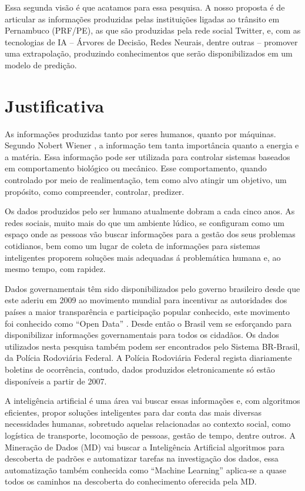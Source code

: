 Essa segunda visão é que acatamos para essa pesquisa. A nosso proposta é de articular as informações produzidas pelas instituições ligadas ao trânsito em Pernambuco (PRF/PE), as que são produzidas pela rede social Twitter, e, com as tecnologias de IA -- Árvores de Decisão, Redes Neurais, dentre outras -- promover uma extrapolação, produzindo conhecimentos que serão disponibilizados em um modelo de predição.

\section{Justificativa}

As informações produzidas tanto por seres humanos, quanto por máquinas. Segundo Nobert Wiener \cite{Salles2007}, a informação tem tanta importância quanto a energia e a matéria. Essa informação pode ser utilizada para controlar sistemas baseados em comportamento biológico ou mecânico. Esse comportamento, quando controlado por meio de realimentação, tem como alvo atingir um objetivo, um propósito, como compreender, controlar, predizer.

Os dados produzidos pelo ser humano atualmente dobram a cada cinco anos. As redes sociais, muito mais do que um ambiente lúdico, se configuram como um espaço onde as pessoas vão buscar informações para a gestão dos seus problemas cotidianos, bem como um lugar de coleta de informações para sistemas inteligentes proporem soluções mais adequadas á problemática humana e, ao mesmo tempo, com rapidez.

Dados governamentais têm sido disponibilizados pelo governo brasileiro desde que este aderiu em 2009 ao movimento mundial para incentivar as autoridades dos países a maior transparência e participação popular conhecido, este movimento foi conhecido como ``Open Data'' \cite{DadosGoverno}. Desde então o Brasil vem se esforçando para disponibilizar informações governamentais para todos os cidadãos. Os dados utilizados nesta pesquisa também podem ser encontrados pelo Sistema BR-Brasil, da Polícia Rodoviária Federal. A Polícia Rodoviária Federal regista diariamente boletins de ocorrência, contudo, dados produzidos eletronicamente só estão disponíveis a partir de 2007.

A inteligência artificial é uma área vai buscar essas informações e, com algoritmos eficientes, propor soluções inteligentes para dar conta das mais diversas necessidades humanas, sobretudo aquelas relacionadas ao contexto social, como logística de transporte, locomoção de pessoas, gestão de tempo, dentre outros. A Mineração de Dados (MD) vai buscar a Inteligência Artificial algoritmos para descoberta de padrões e automatizar tarefas na investigação dos dados, essa automatização também conhecida como ``Machine Learning'' aplica-se a quase todos os caminhos na descoberta do conhecimento oferecida pela MD.
 
